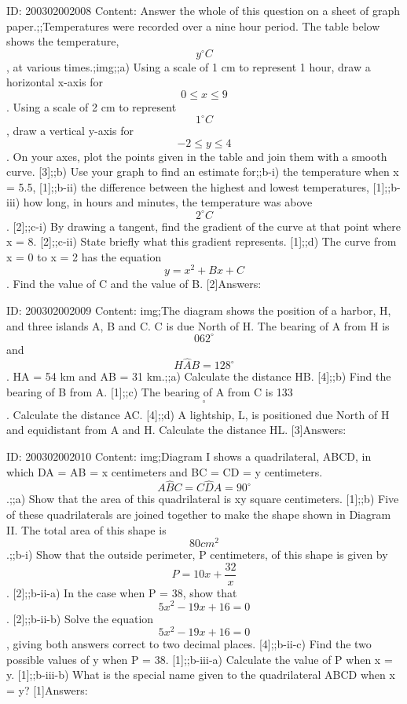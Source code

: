 \documentclass{article}
\begin{document}
ID: 200302002008
Content:
Answer the whole of this question on a sheet of graph paper.;;Temperatures were recorded over a nine hour period. The table below shows the temperature, $$y ^{\circ}C$$, at various times.;img;;a) Using a scale of 1 cm to represent 1 hour, draw a horizontal x-axis for $$0\leq x\leq 9$$. Using a scale of 2 cm to represent $$1^{\circ}C$$, draw a vertical y-axis for $$-2\leq y\leq 4$$. On your axes, plot the points given in the table and join them with a smooth curve. [3];;b) Use your graph to find an estimate for;;b-i) the temperature when x = 5.5, [1];;b-ii) the difference between the highest and lowest temperatures, [1];;b-iii) how long, in hours and minutes, the temperature was above $$2^{\circ}C$$. [2];;c-i) By drawing a tangent, find the gradient of the curve at that point where x = 8. [2];;c-ii) State briefly what this gradient represents. [1];;d) The curve from x = 0 to x = 2 has the equation $$y=x^{2} +Bx+C$$. Find the value of C and the value of B. [2]Answers:

ID: 200302002009
Content:
img;The diagram shows the position of a harbor, H, and three islands A, B and C. C is due North of H. The bearing of A from H is $$062^{\circ}$$ and $$H \hat AB=128^{\circ}$$. HA = 54 km and AB = 31 km.;;a) Calculate the distance HB. [4];;b) Find the bearing of B from A. [1];;c) The bearing of A from C is 133$$^{\circ}$$. Calculate the distance AC. [4];;d) A lightship, L, is positioned due North of H and equidistant from A and H. Calculate the distance HL. [3]Answers:

ID: 200302002010
Content:
img;Diagram I shows a quadrilateral, ABCD, in which DA = AB = x centimeters and BC = CD = y centimeters. $$A \hat BC=C \hat DA=90^{\circ}$$.;;a) Show that the area of this quadrilateral is xy square centimeters. [1];;b) Five of these quadrilaterals are joined together to make the shape shown in Diagram II. The total area of this shape is $$80 cm^{2} $$.;;b-i) Show that the outside perimeter, P centimeters, of this shape is given by $$P=10x+\frac{32}{x}$$. [2];;b-ii-a) In the case when P = 38, show that $$5x^{2} -19x+16=0$$. [2];;b-ii-b) Solve the equation $$5x^{2} -19x+16=0$$, giving both answers correct to two decimal places. [4];;b-ii-c) Find the two possible values of y when P = 38. [1];;b-iii-a) Calculate the value of P when x = y. [1];;b-iii-b) What is the special name given to the quadrilateral ABCD when x = y? [1]Answers:
\end{document}
